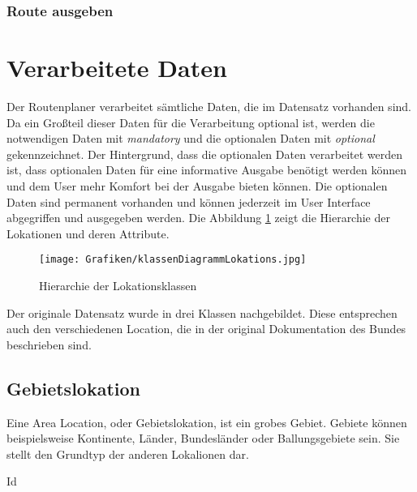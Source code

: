 \documentclass[12pt, a4paper, ngerman]{article}
\begin{document}
\subsubsection{Route ausgeben \label{uc:RouteAusgeben}}
\begin{usecase}
\end{usecase}

\section{Verarbeitete Daten}
Der Routenplaner verarbeitet sämtliche Daten, die im Datensatz vorhanden sind. Da ein Großteil dieser Daten für die Verarbeitung optional ist, werden die notwendigen Daten mit \textit{mandatory} und die optionalen Daten mit \textit{optional} gekennzeichnet. Der Hintergrund, dass die optionalen Daten verarbeitet werden ist, dass optionalen Daten für eine informative Ausgabe benötigt werden können und dem User mehr Komfort bei der Ausgabe bieten können. Die optionalen Daten sind permanent vorhanden und können jederzeit im User Interface abgegriffen und ausgegeben werden.
Die Abbildung \ref{fig:klassendiagrammLokations} zeigt die Hierarchie der Lokationen und deren Attribute.

\begin{figure}[htbp] 
  \centering
     \texttt{[image: Grafiken/klassenDiagrammLokations.jpg]}
  \caption{Hierarchie der Lokationsklassen}
  \label{fig:klassendiagrammLokations}
\end{figure}

Der originale Datensatz wurde in drei Klassen nachgebildet. Diese entsprechen auch den verschiedenen Location, die in der original Dokumentation des Bundes beschrieben sind.
\subsection{Gebietslokation \label{AreaLocation}}
Eine Area Location, oder Gebietslokation, ist ein grobes Gebiet. Gebiete können beispielsweise Kontinente, Länder, Bundesländer oder Ballungsgebiete sein. Sie stellt den Grundtyp der anderen Lokalionen dar.

\begin{attribut}{Id}
\end{attribut}
\end{document}
